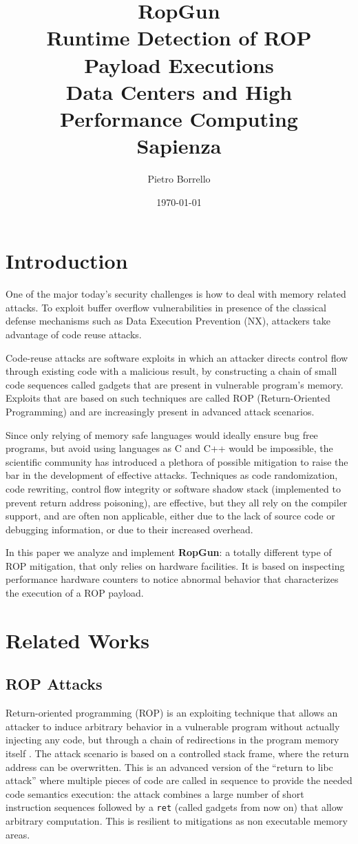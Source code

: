 \documentclass[11pt]{article}
\title{RopGun \\ Runtime Detection of ROP Payload Executions\\\bigskip\large Data Centers and High Performance Computing\\Sapienza}
\author{Pietro Borrello}
\date{\today}
\begin{document}
\maketitle

\tableofcontents
\newpage

\section{Introduction}
One of the major today's security challenges is how to deal with memory related attacks. To exploit buffer overflow vulnerabilities in presence of the classical defense mechanisms such as Data Execution Prevention (NX), attackers take advantage of code reuse attacks.

Code-reuse attacks are software exploits in which an attacker directs control flow through existing code with a malicious result, by constructing a chain of small code sequences called gadgets that are present in vulnerable program's memory. Exploits that are based on such techniques are called ROP (Return-Oriented Programming) and are increasingly present in advanced attack scenarios.

Since only relying of memory safe languages would ideally ensure bug free programs, but avoid using languages as C and C++ would be impossible, the scientific community has introduced a plethora of possible mitigation to raise the bar in the development of effective attacks. Techniques as code randomization, code rewriting, control flow integrity or software shadow stack (implemented to prevent return address poisoning), are effective, but they all rely on the compiler support, and are often non applicable,  either due to the lack of source code or debugging information, or due to their increased overhead.

In this paper we analyze and implement {\bf RopGun}: a totally different type of ROP mitigation, that only relies on hardware facilities. It is based on inspecting performance hardware counters to notice abnormal behavior that characterizes the execution of a ROP payload.

\section{Related Works}

\subsection{ROP Attacks}
Return-oriented programming (ROP) is an exploiting technique that allows an attacker to induce arbitrary behavior in a vulnerable program without actually injecting any code, but through a chain of redirections in the program memory itself \cite{rop}. The attack scenario is based on a controlled stack frame, where the return address can be overwritten. This is an advanced version of the “return to libc attack” \cite{ret2libc} where multiple pieces of code are called in sequence to provide the needed code semantics execution: the attack combines a large number of short instruction sequences followed by a {\tt ret} (called gadgets from now on) that allow arbitrary computation. This is resilient to mitigations as non executable memory areas.
\end{document}
